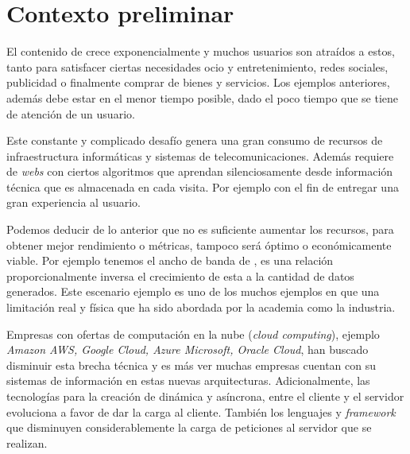 
\section{Contexto preliminar}\label{sec:preliminar}

	
El contenido de \inet crece exponencialmente y muchos usuarios son atraídos a estos, tanto para satisfacer ciertas necesidades   ocio y entretenimiento, redes sociales,  publicidad o finalmente comprar de bienes y servicios. Los ejemplos anteriores, además debe estar en el menor tiempo posible, dado el poco tiempo que se tiene de atención de un usuario.

Este constante y complicado desafío genera una gran consumo de recursos de infraestructura informáticas y sistemas de telecomunicaciones. Además  requiere de \emph{webs} con ciertos algoritmos que aprendan silenciosamente desde información técnica que es almacenada en cada visita. Por ejemplo con el fin de entregar una gran experiencia al usuario.



Podemos deducir de lo anterior que no es suficiente aumentar los recursos, para obtener  mejor rendimiento o métricas, tampoco será óptimo o económicamente viable. Por ejemplo tenemos el ancho de banda de \inet, es una relación proporcionalmente inversa el crecimiento de esta a la cantidad de datos generados. Este escenario ejemplo es uno de los muchos ejemplos en que una limitación real y física que ha sido abordada por la academia como la industria. 

Empresas con ofertas de computación en la nube (\emph{cloud computing}), ejemplo \emph{Amazon AWS, Google Cloud, Azure Microsoft, Oracle Cloud}, han buscado disminuir esta brecha técnica y es más ver muchas empresas cuentan con su sistemas de información en estas nuevas arquitecturas. Adicionalmente, las tecnologías para la creación de \www dinámica y asíncrona, entre el cliente y el servidor evoluciona a favor de dar la carga al cliente. También los lenguajes y \emph{framework} que disminuyen considerablemente la carga de peticiones al servidor que se realizan.

